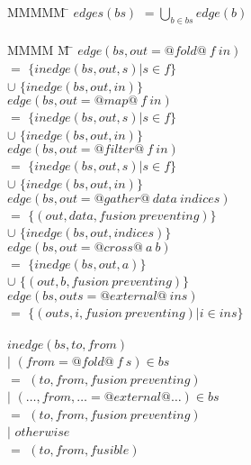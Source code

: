 \begin{tabbing}
MMMMM       \= \kill
$edges(bs)$ \> $= \bigcup_{b \in bs}edge(b)$    \\
\\
MMMM             \= M \= \kill
$edge(bs, out = @fold@~f~in)$ \\
                              \> $=$    \> $\{inedge(bs,out,s) | s \in f\}$ \\
                              \> $\cup$ \> $\{inedge(bs, out, in) \}$       \\
$edge(bs, out = @map@~f~in)$  \\
                              \> $=$    \> $\{inedge(bs,out,s) | s \in f\}$ \\
                              \> $\cup$ \> $\{inedge(bs, out, in) \}$       \\
$edge(bs, out = @filter@~f~in)$  \\
                              \> $=$    \> $\{inedge(bs,out,s) | s \in f\}$ \\
                              \> $\cup$ \> $\{inedge(bs, out, in) \}$       \\
$edge(bs, out = @gather@~data~indices)$  \\
                              \> $=$    \> $\{(out,data, fusion~preventing) \}$ \\
                              \> $\cup$ \> $\{inedge(bs, out, indices) \}$       \\
$edge(bs, out = @cross@~a~b)$            \\
                              \> $=$    \> $\{inedge(bs, out, a) \}$       \\
                              \> $\cup$ \> $\{(out, b, fusion~preventing) \}$ \\
$edge(bs, outs = @external@~ins)$  \\
                              \> $=$    \> $\{(outs,i, fusion~preventing) | i \in ins \}$ \\
\\
$inedge(bs,to,from)$ \\
                     \> $|$ \> $(from = @fold@~f~s) \in bs$     \\
                     \> $=$ \> $(to, from, fusion~preventing)$  \\
                     \> $|$ \> $(\ldots,from,\ldots = @external@ \ldots) \in bs$     \\
                     \> $=$ \> $(to, from, fusion~preventing)$  \\
                     \> $|$ \> $otherwise$                      \\
                     \> $=$ \> $(to, from, fusible)$            \\
\end{tabbing}


